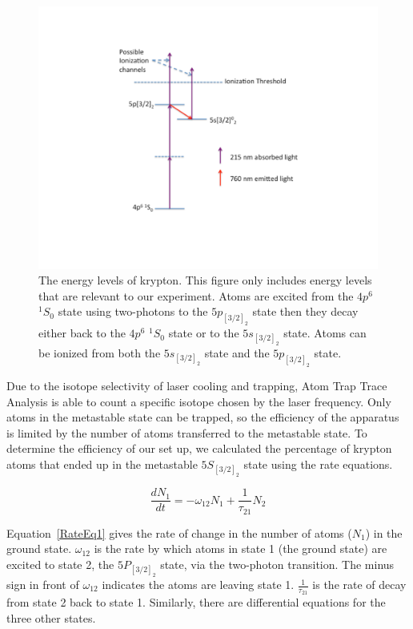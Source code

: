 \documentclass[prb,preprint]{revtex4-1}
\begin{document}
\begin{figure}[h!]
\centering
\includegraphics[width=6in]{KrEnergyLevels.pdf}
\caption{The energy levels of krypton. This figure only includes energy levels that are relevant to our experiment. Atoms are excited from the $4p^6$ $^1S_0$ state using two-photons to the $5p_{[3/2]_2}$ state then they decay either back to the $4p^6$ $^1S_0$ state or to the $5s_{[3/2]_2}$ state. Atoms can be ionized from both the $5s_{[3/2]_2}$ state and the $5p_{[3/2]_2}$ state.}
\label{KrEnergyLevels}
\end{figure}

Due to the isotope selectivity of laser cooling and trapping, Atom Trap Trace Analysis is able to count a specific isotope chosen by the laser frequency.  Only atoms in the metastable state can be trapped, so the efficiency of the apparatus is limited by the number of atoms transferred to the metastable state. To determine the efficiency of our set up, we calculated the percentage of krypton atoms that ended up in the metastable $5S_{[3/2]_2}$ state using the rate equations.

\begin{equation}
\label{RateEq1}
\frac{dN_1}{dt} = -\omega_{12}N_1 + \frac{1}{\tau_{21}}N_2
\end{equation}

Equation~\ref{RateEq1} gives the rate of change in the number of atoms ($N_1$) in the ground state. $\omega_{12}$ is the rate by which atoms in state 1 (the ground state) are excited to state 2, the $5P_{[3/2]_2}$ state, via the two-photon transition. The minus sign in front of $\omega_{12}$ indicates the atoms are leaving state 1. $\frac{1}{\tau_{21}}$ is the rate of decay from state 2 back to state 1. Similarly, there are differential equations for the three other states.
\end{document}

